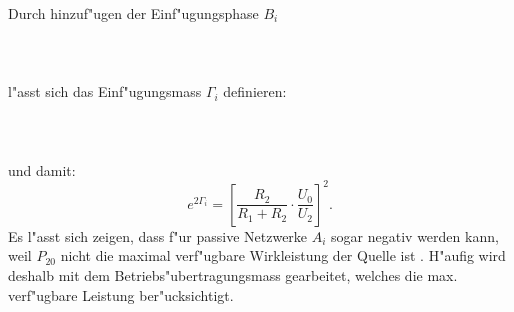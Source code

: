 \nit Durch hinzuf"ugen der Einf"ugungsphase $B_i$\\~~\\
\\~~\\
l"asst sich das Einf"ugungsmass $\Gamma_i$  definieren:\\~~\\
\\~~\\
\nit und damit:
\begin{equation}
e^{2\Gamma_i}=\left[ \frac{R_2}{R_1 + R_2}
                       \cdot \frac{U_0}{U_2} \right]^2.
\end{equation}
Es l"asst sich zeigen, dass f"ur passive
Netzwerke $A_i$ sogar negativ werden kann,
weil $P_{20}$ nicht die maximal verf"ugbare Wirkleistung der Quelle
ist \cite{MOS:89}. H"aufig wird deshalb mit dem Betriebs"ubertragungsmass
gearbeitet, welches die max. verf"ugbare Leistung ber"ucksichtigt.
